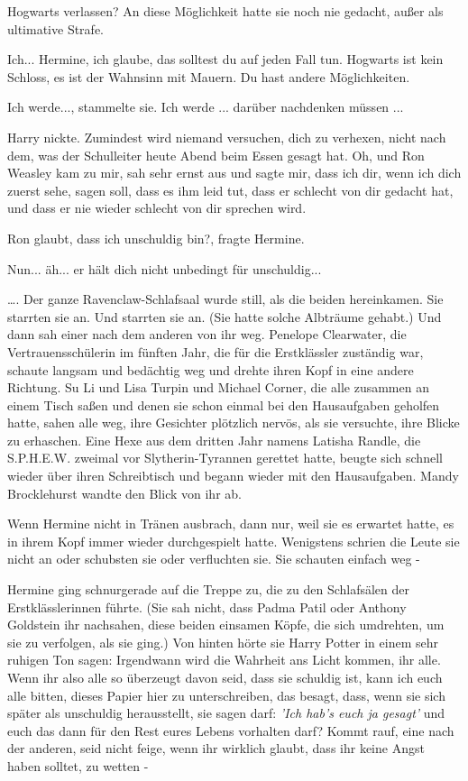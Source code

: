 \glqq Hogwarts verlassen?\grqq{} An diese Möglichkeit hatte sie noch nie
gedacht, außer als ultimative Strafe.

\glqq Ich... Hermine, ich glaube, das solltest du auf jeden Fall tun. Hogwarts
ist kein Schloss, es ist der Wahnsinn mit Mauern. Du hast andere
Möglichkeiten.\grqq{}

\glqq Ich werde...\grqq{}, stammelte sie. \glqq Ich werde ... darüber nachdenken
müssen ...\grqq{}

Harry nickte. \glqq Zumindest wird niemand versuchen, dich zu verhexen, nicht
nach dem, was der Schulleiter heute Abend beim Essen gesagt hat. Oh, und Ron
Weasley kam zu mir, sah sehr ernst aus und sagte mir, dass ich dir, wenn ich
dich zuerst sehe, sagen soll, dass es ihm leid tut, dass er schlecht von dir
gedacht hat, und dass er nie wieder schlecht von dir sprechen wird.\grqq{}

\glqq Ron glaubt, dass ich unschuldig bin?\grqq{}, fragte Hermine.

\glqq Nun... äh... er hält dich nicht unbedingt für unschuldig...\grqq{}


…. Der ganze Ravenclaw-Schlafsaal wurde still, als die beiden hereinkamen. Sie
starrten sie an. Und starrten sie an. (Sie hatte solche Albträume gehabt.) Und
dann sah einer nach dem anderen von ihr weg. Penelope Clearwater, die
Vertrauensschülerin im fünften Jahr, die für die Erstklässler zuständig war,
schaute langsam und bedächtig weg und drehte ihren Kopf in eine andere Richtung.
Su Li und Lisa Turpin und Michael Corner, die alle zusammen an einem Tisch saßen
und denen sie schon einmal bei den Hausaufgaben geholfen hatte, sahen alle weg,
ihre Gesichter plötzlich nervös, als sie versuchte, ihre Blicke zu erhaschen.
Eine Hexe aus dem dritten Jahr namens Latisha Randle, die S.P.H.E.W. zweimal vor
Slytherin-Tyrannen gerettet hatte, beugte sich schnell wieder über ihren
Schreibtisch und begann wieder mit den Hausaufgaben. Mandy Brocklehurst wandte
den Blick von ihr ab.

Wenn Hermine nicht in Tränen ausbrach, dann nur, weil sie es erwartet hatte, es
in ihrem Kopf immer wieder durchgespielt hatte. Wenigstens schrien die Leute sie
nicht an oder schubsten sie oder verfluchten sie. Sie schauten einfach weg -

Hermine ging schnurgerade auf die Treppe zu, die zu den Schlafsälen der
Erstklässlerinnen führte. (Sie sah nicht, dass Padma Patil oder Anthony
Goldstein ihr nachsahen, diese beiden einsamen Köpfe, die sich umdrehten, um sie
zu verfolgen, als sie ging.) Von hinten hörte sie Harry Potter in einem sehr
ruhigen Ton sagen: \glqq Irgendwann wird die Wahrheit ans Licht kommen, ihr
alle. Wenn ihr also alle so überzeugt davon seid, dass sie schuldig ist, kann
ich euch alle bitten, dieses Papier hier zu unterschreiben, das besagt, dass,
wenn sie sich später als unschuldig herausstellt, sie sagen darf:\emph{ 'Ich
hab's euch ja gesagt' }und euch das dann für den Rest eures Lebens vorhalten
darf? Kommt rauf, eine nach der anderen, seid nicht feige, wenn ihr wirklich
glaubt, dass ihr keine Angst haben solltet, zu wetten -\grqq{}

